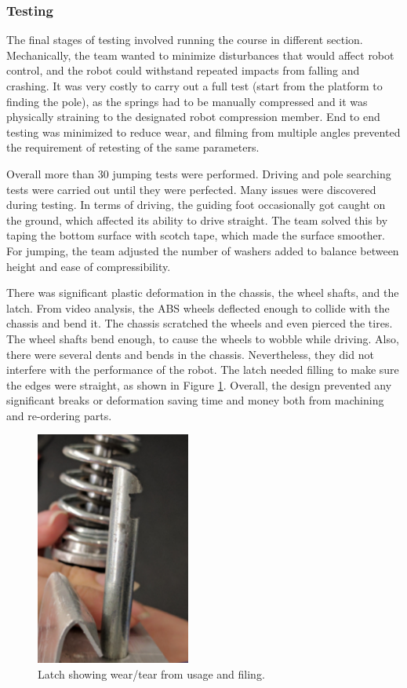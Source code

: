 \documentclass[ece]{uw-wkrpt}
\begin{document}
\subsubsection{Testing}

The final stages of testing involved running the course in different section. Mechanically, the team wanted to minimize disturbances that would affect robot control, and the robot could withstand repeated impacts from falling and crashing. It was very costly to carry out a full test (start from the platform to finding the pole), as the springs had to be manually compressed and it was physically straining to the designated robot compression member. End to end testing was minimized to reduce wear, and filming from multiple angles prevented the requirement of retesting of the same parameters. 

Overall more than 30 jumping tests were performed. Driving and pole searching tests were carried out until they were perfected. Many issues were discovered during testing. In terms of driving, the guiding foot occasionally got caught on the ground, which affected its ability to drive straight. The team solved this by taping the bottom surface with scotch tape, which made the surface smoother. For jumping, the team adjusted the number of washers added to balance between height and ease of compressibility. 

There was significant plastic deformation in the chassis, the wheel shafts, and the latch. From video analysis, the ABS wheels deflected enough to collide with the chassis and bend it. The chassis scratched the wheels and even pierced the tires. The wheel shafts bend enough, to cause the wheels to wobble while driving. Also, there were several dents and bends in the chassis. Nevertheless, they did not interfere with the performance of the robot. The latch needed filling to make sure the edges were straight, as shown in Figure \ref{fig:mech13}. Overall, the design prevented any significant breaks or deformation saving time and money both from machining and re-ordering parts.

\begin{figure}
    \centering
    \includegraphics[width=2.0in]{res/mech13}
    \caption[Latch showing wear/tear from usage and filing]
          {Latch showing wear/tear from usage and filing.}
    \label{fig:mech13}
\end{figure}
\end{document}
